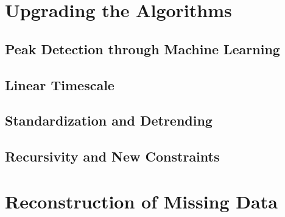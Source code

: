 \documentclass[../../CompleteThesis/Complete_1stDraft.tex]{subfiles}
\begin{document}
\section[Upgrading the Algorithms]{Upgrading the Algorithms}
\label{Sec:Method_UpgradingAlgorithms}
\subsection[Peak Detection: ML]{Peak Detection through Machine Learning}
\label{Subsec:Method_UpgradingAlgorithms_PeakDetectionML}


\subsection[Linear Timescale]{Linear Timescale}
\label{Subsec:Method_UpgradingAlgorithms_LinearTimescale}


\subsection[Standardization]{Standardization and Detrending}
\label{Subsec:Method_UpgradingAlgorithms_Standardization}


\subsection[Recursivity and Constraints]{Recursivity and New Constraints}
\label{Subsec:Method_UpgradingAlgorithms_RecurseAndConstraints}






\newpage

\section[Missing Data]{Reconstruction of Missing Data}
\label{Sec:Method_MissingData}

\end{document}
